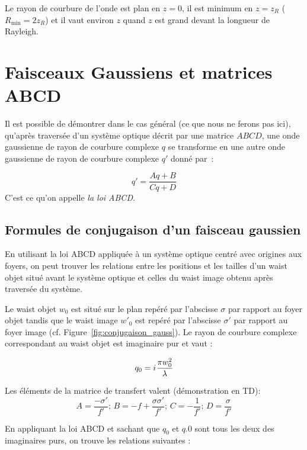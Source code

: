 \documentclass[a4paper]{book}
\newcommand{\iu}{{i\mkern1mu}}
\begin{document}
Le rayon de courbure de l'onde est plan en $z=0$, il est minimum en $z = z_R$ ($R_\textrm{min}=2z_R$) et il vaut environ $z$ quand $z$ est grand devant la longueur de Rayleigh.


\section{Faisceaux Gaussiens et matrices ABCD}

Il est possible de démontrer dans le cas général (ce que nous ne ferons pas ici), qu'après traversée d'un système optique décrit par une matrice $ABCD$, une onde gaussienne de rayon de courbure complexe $q$ se transforme en une autre onde gaussienne de rayon de courbure complexe $q'$ donné par~:

\begin{equation}
    q'=\frac{Aq+B}{Cq+D}
\end{equation}
C'est ce qu'on appelle \textit{la loi ABCD}.

\subsection{Formules de conjugaison d'un faisceau gaussien}

En utilisant la loi ABCD appliquée à un système optique centré avec origines aux foyers, on peut trouver les relations entre les positions et les tailles d'un waist objet situé avant le système optique et celles du waist image obtenu après traversée du système.


Le waist objet $w_0$ est situé sur le plan repéré par l'abscisse $\sigma$ par rapport au foyer objet tandis que le waist image $w'_0$ est repéré par l'abscisse $\sigma'$ par rapport au foyer image (cf. Figure~\ref{fig:conjugaison_gauss}). Le rayon de courbure complexe correspondant au waist objet est imaginaire pur et vaut :

\begin{equation}
    q_0=\iu \frac{\pi w_0^2}{\lambda}
\end{equation}

Les éléments de la matrice de transfert valent (démonstration en TD):
\begin{equation}
    A=\frac{-\sigma'}{f'};\,B=-f+\frac{\sigma \sigma'}{f'};\,C=-\frac{1}{f'};\,D=\frac{\sigma}{f'}
\end{equation}

En appliquant la loi ABCD et sachant que $q_0$ et $q_'0$ sont tous les deux des imaginaires purs, on trouve les relations suivantes :
\end{document}

